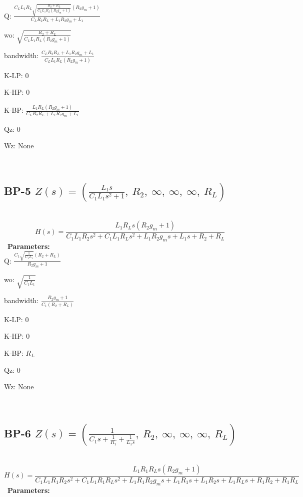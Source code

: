 \documentclass{article}
\begin{document}
Q: $\frac{C_{L} L_{1} R_{L} \sqrt{\frac{R_{2} + R_{L}}{C_{L} L_{1} R_{L} \left(R_{2} g_{m} + 1\right)}} \left(R_{2} g_{m} + 1\right)}{C_{L} R_{2} R_{L} + L_{1} R_{2} g_{m} + L_{1}}$\ 

wo: $\sqrt{\frac{R_{2} + R_{L}}{C_{L} L_{1} R_{L} \left(R_{2} g_{m} + 1\right)}}$\ 

bandwidth: $\frac{C_{L} R_{2} R_{L} + L_{1} R_{2} g_{m} + L_{1}}{C_{L} L_{1} R_{L} \left(R_{2} g_{m} + 1\right)}$\ 

K-LP: $0$\ 

K-HP: $0$\ 

K-BP: $\frac{L_{1} R_{L} \left(R_{2} g_{m} + 1\right)}{C_{L} R_{2} R_{L} + L_{1} R_{2} g_{m} + L_{1}}$\ 

Qz: $0$\ 

Wz: $\text{None}$\ 

\ 

\subsection{BP-5 $Z(s) = \left( \frac{L_{1} s}{C_{1} L_{1} s^{2} + 1}, \  R_{2}, \  \infty, \  \infty, \  \infty, \  R_{L}\right)$ } \ 
\textbf{\[H(s) = \frac{L_{1} R_{L} s \left(R_{2} g_{m} + 1\right)}{C_{1} L_{1} R_{2} s^{2} + C_{1} L_{1} R_{L} s^{2} + L_{1} R_{2} g_{m} s + L_{1} s + R_{2} + R_{L}}\] } \ 
\textbf{Parameters:}\\ 

Q: $\frac{C_{1} \sqrt{\frac{1}{C_{1} L_{1}}} \left(R_{2} + R_{L}\right)}{R_{2} g_{m} + 1}$\ 

wo: $\sqrt{\frac{1}{C_{1} L_{1}}}$\ 

bandwidth: $\frac{R_{2} g_{m} + 1}{C_{1} \left(R_{2} + R_{L}\right)}$\ 

K-LP: $0$\ 

K-HP: $0$\ 

K-BP: $R_{L}$\ 

Qz: $0$\ 

Wz: $\text{None}$\ 

\ 

\subsection{BP-6 $Z(s) = \left( \frac{1}{C_{1} s + \frac{1}{R_{1}} + \frac{1}{L_{1} s}}, \  R_{2}, \  \infty, \  \infty, \  \infty, \  R_{L}\right)$ } \ 
\textbf{\[H(s) = \frac{L_{1} R_{1} R_{L} s \left(R_{2} g_{m} + 1\right)}{C_{1} L_{1} R_{1} R_{2} s^{2} + C_{1} L_{1} R_{1} R_{L} s^{2} + L_{1} R_{1} R_{2} g_{m} s + L_{1} R_{1} s + L_{1} R_{2} s + L_{1} R_{L} s + R_{1} R_{2} + R_{1} R_{L}}\] } \ 
\textbf{Parameters:}\\ 
\end{document}
